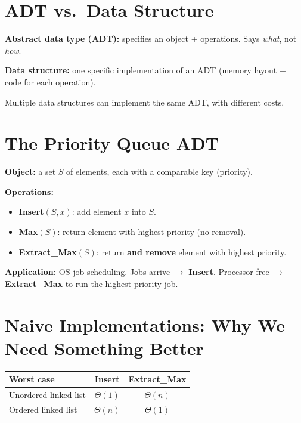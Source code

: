 \documentclass[11pt]{article}
\begin{document}
\section{ADT vs.\ Data Structure}

\begin{defbox}
\textbf{Abstract data type (ADT):} specifies an \textcolor{rustW}{object} + \textcolor{rustW}{operations}. Says \emph{what}, not \emph{how}.

\textbf{Data structure:} \textcolor{rustW}{one specific implementation} of an ADT (memory layout + code for each operation).

Multiple data structures can implement the same ADT, with different costs.
\end{defbox}

\section{The Priority Queue ADT}

\begin{defbox}
\textbf{Object:} a set $S$ of elements, each with a comparable \textcolor{rustW}{key} (priority).

\textbf{Operations:}
\begin{itemize}[leftmargin=1.4em,itemsep=1pt]
  \item \textbf{Insert}$(S,x)$: add element $x$ into $S$.
  \item \textbf{Max}$(S)$: return element with highest priority (no removal).
  \item \textbf{Extract\_Max}$(S)$: return \textbf{and remove} element with highest priority.
\end{itemize}
\end{defbox}

\textbf{Application:} OS job scheduling. Jobs arrive $\to$ \textbf{Insert}. Processor free $\to$ \textbf{Extract\_Max} to run the highest-priority job.

\section{Naive Implementations: Why We Need Something Better}

\begin{center}
\renewcommand{\arraystretch}{1.5}
\begin{tabular}{l c c}
\hline
\textbf{\textcolor{heapblue}{Worst case}} & \textbf{Insert} & \textbf{Extract\_Max}\\
\hline
Unordered linked list & \textcolor{greenO}{$\Theta(1)$} & \textcolor{rustW}{$\Theta(n)$}\\
Ordered linked list   & \textcolor{rustW}{$\Theta(n)$} & \textcolor{greenO}{$\Theta(1)$}\\
\hline
\end{tabular}
\end{center}
\end{document}
